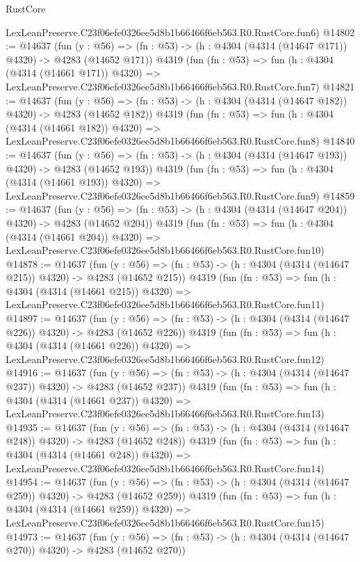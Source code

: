 \begin{lexlean}{RustCore}
\begin{coremodule}
    LexLeanPreserve.C23f06efe0326ee5d8b1b66466f6eb563.R0.RustCore.fun6)
@14802 := @14637
    (fun (y : @56) => (fn : @53) -> (h : @4304 (@4314 (@14647 @171)) @4320) -> @4283 (@14652 @171))
    @4319
    (fun (fn : @53) =>
    fun (h : @4304 (@4314 (@14661 @171)) @4320) =>
    LexLeanPreserve.C23f06efe0326ee5d8b1b66466f6eb563.R0.RustCore.fun7)
@14821 := @14637
    (fun (y : @56) => (fn : @53) -> (h : @4304 (@4314 (@14647 @182)) @4320) -> @4283 (@14652 @182))
    @4319
    (fun (fn : @53) =>
    fun (h : @4304 (@4314 (@14661 @182)) @4320) =>
    LexLeanPreserve.C23f06efe0326ee5d8b1b66466f6eb563.R0.RustCore.fun8)
@14840 := @14637
    (fun (y : @56) => (fn : @53) -> (h : @4304 (@4314 (@14647 @193)) @4320) -> @4283 (@14652 @193))
    @4319
    (fun (fn : @53) =>
    fun (h : @4304 (@4314 (@14661 @193)) @4320) =>
    LexLeanPreserve.C23f06efe0326ee5d8b1b66466f6eb563.R0.RustCore.fun9)
@14859 := @14637
    (fun (y : @56) => (fn : @53) -> (h : @4304 (@4314 (@14647 @204)) @4320) -> @4283 (@14652 @204))
    @4319
    (fun (fn : @53) =>
    fun (h : @4304 (@4314 (@14661 @204)) @4320) =>
    LexLeanPreserve.C23f06efe0326ee5d8b1b66466f6eb563.R0.RustCore.fun10)
@14878 := @14637
    (fun (y : @56) => (fn : @53) -> (h : @4304 (@4314 (@14647 @215)) @4320) -> @4283 (@14652 @215))
    @4319
    (fun (fn : @53) =>
    fun (h : @4304 (@4314 (@14661 @215)) @4320) =>
    LexLeanPreserve.C23f06efe0326ee5d8b1b66466f6eb563.R0.RustCore.fun11)
@14897 := @14637
    (fun (y : @56) => (fn : @53) -> (h : @4304 (@4314 (@14647 @226)) @4320) -> @4283 (@14652 @226))
    @4319
    (fun (fn : @53) =>
    fun (h : @4304 (@4314 (@14661 @226)) @4320) =>
    LexLeanPreserve.C23f06efe0326ee5d8b1b66466f6eb563.R0.RustCore.fun12)
@14916 := @14637
    (fun (y : @56) => (fn : @53) -> (h : @4304 (@4314 (@14647 @237)) @4320) -> @4283 (@14652 @237))
    @4319
    (fun (fn : @53) =>
    fun (h : @4304 (@4314 (@14661 @237)) @4320) =>
    LexLeanPreserve.C23f06efe0326ee5d8b1b66466f6eb563.R0.RustCore.fun13)
@14935 := @14637
    (fun (y : @56) => (fn : @53) -> (h : @4304 (@4314 (@14647 @248)) @4320) -> @4283 (@14652 @248))
    @4319
    (fun (fn : @53) =>
    fun (h : @4304 (@4314 (@14661 @248)) @4320) =>
    LexLeanPreserve.C23f06efe0326ee5d8b1b66466f6eb563.R0.RustCore.fun14)
@14954 := @14637
    (fun (y : @56) => (fn : @53) -> (h : @4304 (@4314 (@14647 @259)) @4320) -> @4283 (@14652 @259))
    @4319
    (fun (fn : @53) =>
    fun (h : @4304 (@4314 (@14661 @259)) @4320) =>
    LexLeanPreserve.C23f06efe0326ee5d8b1b66466f6eb563.R0.RustCore.fun15)
@14973 := @14637
    (fun (y : @56) => (fn : @53) -> (h : @4304 (@4314 (@14647 @270)) @4320) -> @4283 (@14652 @270))

\end{coremodule}
\end{lexlean}
